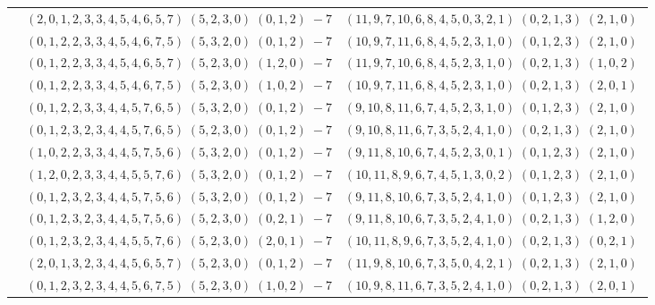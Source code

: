 \documentclass[11pt]{article}
\begin{document}
\begin{longtable}[l]{|c|c|c|}
 \cline{2-3} 
 & $(2 ,0 ,1 ,2 ,3 ,3 ,4 ,5 ,4 ,6 ,5 ,7) \;(5 ,2 ,3 ,0) \;(0 ,1 ,2) \;-7$ & $(11 ,9 ,7 ,10 ,6 ,8 ,4 ,5 ,0 ,3 ,2 ,1) \;(0 ,2 ,1 ,3) \;(2 ,1 ,0) \;$\\ 
 \cline{2-3} 
 & $(0 ,1 ,2 ,2 ,3 ,3 ,4 ,5 ,4 ,6 ,7 ,5) \;(5 ,3 ,2 ,0) \;(0 ,1 ,2) \;-7$ & $(10 ,9 ,7 ,11 ,6 ,8 ,4 ,5 ,2 ,3 ,1 ,0) \;(0 ,1 ,2 ,3) \;(2 ,1 ,0) \;$\\ 
 \cline{2-3} 
 & $(0 ,1 ,2 ,2 ,3 ,3 ,4 ,5 ,4 ,6 ,5 ,7) \;(5 ,2 ,3 ,0) \;(1 ,2 ,0) \;-7$ & $(11 ,9 ,7 ,10 ,6 ,8 ,4 ,5 ,2 ,3 ,1 ,0) \;(0 ,2 ,1 ,3) \;(1 ,0 ,2) \;$\\ 
 \cline{2-3} 
 & $(0 ,1 ,2 ,2 ,3 ,3 ,4 ,5 ,4 ,6 ,7 ,5) \;(5 ,2 ,3 ,0) \;(1 ,0 ,2) \;-7$ & $(10 ,9 ,7 ,11 ,6 ,8 ,4 ,5 ,2 ,3 ,1 ,0) \;(0 ,2 ,1 ,3) \;(2 ,0 ,1) \;$\\ 
 \cline{2-3} 
 & $(0 ,1 ,2 ,2 ,3 ,3 ,4 ,4 ,5 ,7 ,6 ,5) \;(5 ,3 ,2 ,0) \;(0 ,1 ,2) \;-7$ & $(9 ,10 ,8 ,11 ,6 ,7 ,4 ,5 ,2 ,3 ,1 ,0) \;(0 ,1 ,2 ,3) \;(2 ,1 ,0) \;$\\ 
 \cline{2-3} 
 & $(0 ,1 ,2 ,3 ,2 ,3 ,4 ,4 ,5 ,7 ,6 ,5) \;(5 ,2 ,3 ,0) \;(0 ,1 ,2) \;-7$ & $(9 ,10 ,8 ,11 ,6 ,7 ,3 ,5 ,2 ,4 ,1 ,0) \;(0 ,2 ,1 ,3) \;(2 ,1 ,0) \;$\\ 
 \cline{2-3} 
 & $(1 ,0 ,2 ,2 ,3 ,3 ,4 ,4 ,5 ,7 ,5 ,6) \;(5 ,3 ,2 ,0) \;(0 ,1 ,2) \;-7$ & $(9 ,11 ,8 ,10 ,6 ,7 ,4 ,5 ,2 ,3 ,0 ,1) \;(0 ,1 ,2 ,3) \;(2 ,1 ,0) \;$\\ 
 \cline{2-3} 
 & $(1 ,2 ,0 ,2 ,3 ,3 ,4 ,4 ,5 ,5 ,7 ,6) \;(5 ,3 ,2 ,0) \;(0 ,1 ,2) \;-7$ & $(10 ,11 ,8 ,9 ,6 ,7 ,4 ,5 ,1 ,3 ,0 ,2) \;(0 ,1 ,2 ,3) \;(2 ,1 ,0) \;$\\ 
 \cline{2-3} 
 & $(0 ,1 ,2 ,3 ,2 ,3 ,4 ,4 ,5 ,7 ,5 ,6) \;(5 ,3 ,2 ,0) \;(0 ,1 ,2) \;-7$ & $(9 ,11 ,8 ,10 ,6 ,7 ,3 ,5 ,2 ,4 ,1 ,0) \;(0 ,1 ,2 ,3) \;(2 ,1 ,0) \;$\\ 
 \cline{2-3} 
 & $(0 ,1 ,2 ,3 ,2 ,3 ,4 ,4 ,5 ,7 ,5 ,6) \;(5 ,2 ,3 ,0) \;(0 ,2 ,1) \;-7$ & $(9 ,11 ,8 ,10 ,6 ,7 ,3 ,5 ,2 ,4 ,1 ,0) \;(0 ,2 ,1 ,3) \;(1 ,2 ,0) \;$\\ 
 \cline{2-3} 
 & $(0 ,1 ,2 ,3 ,2 ,3 ,4 ,4 ,5 ,5 ,7 ,6) \;(5 ,2 ,3 ,0) \;(2 ,0 ,1) \;-7$ & $(10 ,11 ,8 ,9 ,6 ,7 ,3 ,5 ,2 ,4 ,1 ,0) \;(0 ,2 ,1 ,3) \;(0 ,2 ,1) \;$\\ 
 \cline{2-3} 
 & $(2 ,0 ,1 ,3 ,2 ,3 ,4 ,4 ,5 ,6 ,5 ,7) \;(5 ,2 ,3 ,0) \;(0 ,1 ,2) \;-7$ & $(11 ,9 ,8 ,10 ,6 ,7 ,3 ,5 ,0 ,4 ,2 ,1) \;(0 ,2 ,1 ,3) \;(2 ,1 ,0) \;$\\ 
 \cline{2-3} 
 & $(0 ,1 ,2 ,3 ,2 ,3 ,4 ,4 ,5 ,6 ,7 ,5) \;(5 ,2 ,3 ,0) \;(1 ,0 ,2) \;-7$ & $(10 ,9 ,8 ,11 ,6 ,7 ,3 ,5 ,2 ,4 ,1 ,0) \;(0 ,2 ,1 ,3) \;(2 ,0 ,1) \;$\\ 

\end{longtable}
\end{document}
